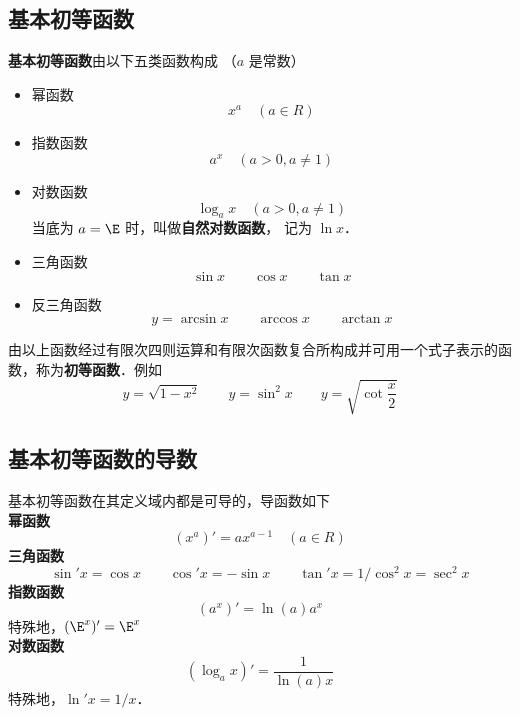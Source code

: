 

\subsection{基本初等函数}
\textbf{基本初等函数}由以下五类函数构成 （$a$ 是常数）

\begin{itemize}
\item 幂函数
\begin{equation}
{x^a} \quad(a \in R)
\end{equation}
\item 指数函数
\begin{equation}
{a^x} \quad(a > 0 , a \ne 1)
\end{equation}
\item 对数函数
\begin{equation}
{\log _a}x \quad(a > 0 , a \ne 1)
\end{equation}
当底为 $a = \E$ 时，叫做\textbf{自然对数函数}， 记为 $\ln x$． \\
\item 三角函数
\begin{equation}
\sin x \qquad  \cos x \qquad \tan x
\end{equation}
\item 反三角函数
\begin{equation}
y = \arcsin x  \qquad \arccos x  \qquad \arctan x
\end{equation}
\end{itemize}

由以上函数经过有限次四则运算和有限次函数复合所构成并可用一个式子表示的函数，称为\textbf{初等函数}．例如
\begin{equation}
y = \sqrt {1 - {x^2}}\qquad y = {\sin ^2}x\qquad y = \sqrt {\cot \frac{x}{2}} 
\end{equation}



\subsection{基本初等函数的导数}

基本初等函数在其定义域内都是可导的，导函数如下\\
\textbf{幂函数}
\begin{equation}
(x^a)' = a x^{a - 1}  \quad (a \in R)
\end{equation}
\textbf{三角函数}
\begin{equation}
\sin' x = \cos x \qquad \cos' x =  - \sin x \qquad
\tan'x = 1/{\cos ^2}x = {\sec ^2}x
\end{equation}
\textbf{指数函数}
\begin{equation}
(a^x)' = \ln(a){a^x}
\end{equation}
特殊地，$(\E^x)' = {\E^x}$\\
\textbf{对数函数}
\begin{equation}
(\log_a x)' = \frac{1}{\ln(a)x}
\end{equation}
特殊地，$\ln' x= 1/x$．

